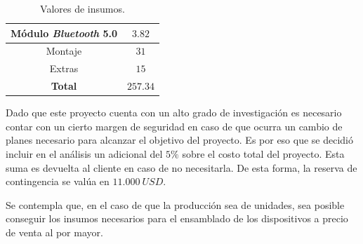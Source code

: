 \begin{table}[H]
\begin{tabular}{|c|c|}
Módulo \textit{Bluetooth} 5.0                                                           & $3.82 $                                   \\ \hline
Montaje                                                               & $31$                                    \\ \hline
Extras
& $15$									\\ \hline
\textbf{Total}
&\textbf{$257.34$} \\ \hline
\end{tabular}
\caption{Valores de insumos.}
\end{table}

Dado que este proyecto cuenta con un alto grado de investigación es necesario contar con un cierto margen de seguridad en caso de que ocurra un cambio de planes necesario para alcanzar el objetivo del proyecto. Es por eso que se decidió incluir en el análisis un adicional del $5\%$ sobre el costo total del proyecto. Esta suma es devuelta al cliente en caso de no necesitarla. De esta forma, la reserva de contingencia se valúa en $11.000 \ USD$.

Se contempla que, en el caso de que la producción sea de \unidadespostfin unidades, sea posible conseguir los insumos necesarios para el ensamblado de los dispositivos a precio de venta al por mayor.
